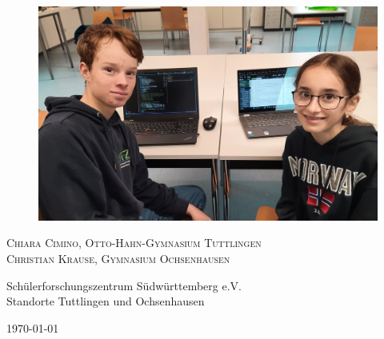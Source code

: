 \documentclass[10pt]{article}
\begin{document}
 

 

\vspace{0.4cm}
\begin{figure}[ht]

    \centering

    \includegraphics[scale=0.1]{Bild Christian Chiara bearbeitet.jpg}

\end{figure}
 \begin{center}

 
     \Large\textsc{Chiara Cimino, Otto-Hahn-Gymnasium Tuttlingen\\Christian Krause, Gymnasium Ochsenhausen}\\\vspace{1cm}

    Schülerforschungszentrum Südwürttemberg e.V.\\Standorte Tuttlingen und Ochsenhausen  \vspace{1.5cm}

     \today

 \end{center}~
 \clearpage
 
\tableofcontents
\listoffigures
\thispagestyle{empty}
\end{document}
